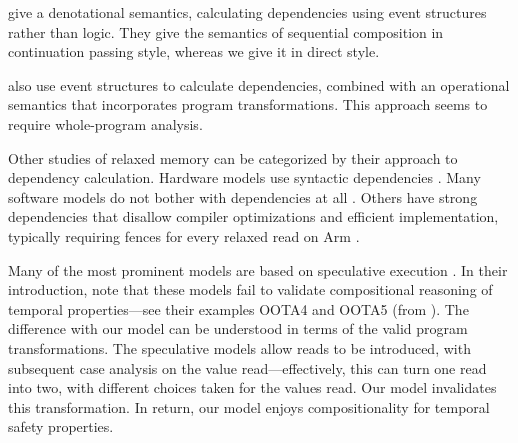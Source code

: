 \citet{DBLP:conf/esop/PaviottiCPWOB20} give a denotational semantics,
calculating dependencies using event structures rather than logic.  They give
the semantics of sequential composition in continuation passing style,
whereas we give it in direct style.

\citet{Pichon-Pharabod:2016:CSR:2837614.2837616} also use event structures to
calculate dependencies, combined with an operational semantics that
incorporates program transformations.  This approach seems to require
whole-program analysis.

Other studies of relaxed memory can be categorized by their approach to
dependency calculation.  Hardware models use syntactic dependencies
\cite{alglave}.  Many software models do not bother with dependencies at all
\cite{Batty:2011:MCC:1926385.1926394, DBLP:journals/pacmpl/WattRP19,
  DBLP:conf/pldi/WattPPBDFPG20, goMM}.  Others have strong dependencies that
disallow compiler optimizations and efficient implementation, typically
requiring fences for every relaxed read on Arm
\cite{Lamport:1979:MMC:1311099.1311750, DBLP:conf/pldi/LahavVKHD17,
  Dolan:2018:BDR:3192366.3192421, DBLP:conf/pldi/LahavVKHD17,
  DBLP:conf/lics/JeffreyR16, Boehm:2014:OGA:2618128.2618134,
  DBLP:journals/corr/abs-1804-04214}.

Many of the most prominent models are based on speculative execution
\cite{Manson:2005:JMM:1047659.1040336, DBLP:conf/esop/JagadeesanPR10,
  DBLP:conf/popl/KangHLVD17,DBLP:journals/pacmpl/ChakrabortyV19,DBLP:conf/pldi/LeeCPCHLV20,promising-ldrf}.
In their introduction, \citet{DBLP:journals/pacmpl/JagadeesanJR20} note that
these models fail to validate compositional reasoning of temporal
properties---see their examples OOTA4 and OOTA5 (from
\citep{DBLP:journals/toplas/Lochbihler13}).  The difference with our model
can be understood in terms of the valid program transformations.  The
speculative models allow reads to be introduced, with subsequent case
analysis on the value read---effectively, this can turn one read into two,
with different choices taken for the values read.  Our model invalidates this
transformation.  In return, our model enjoys compositionality for temporal
safety properties.




